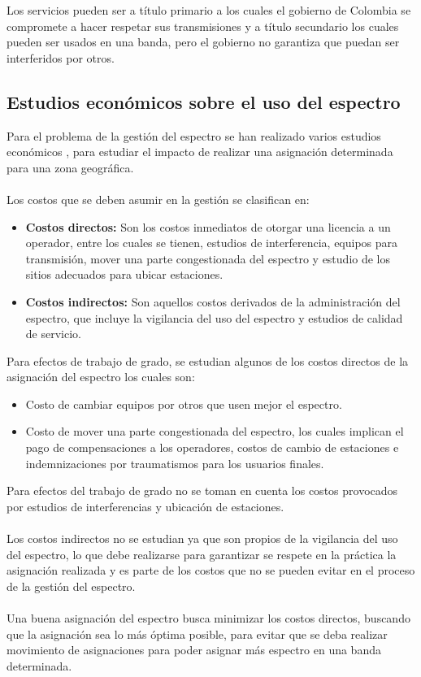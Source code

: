 Los servicios pueden ser a título primario a los cuales el gobierno de Colombia se compromete a hacer respetar sus transmisiones y a título secundario los cuales pueden ser usados en una banda, pero el gobierno no garantiza que puedan ser interferidos por otros.

\subsection{Estudios económicos sobre el uso del espectro}

Para el problema de la gestión del espectro se han realizado varios estudios económicos \cite{SpectrumITU}, para estudiar el impacto de realizar una asignación determinada para una zona geográfica.
\\\\
Los costos que se deben asumir en la gestión se clasifican en:
\begin{itemize}
	\item \textbf{Costos directos:} Son los costos inmediatos de otorgar una licencia a un operador, entre los cuales se tienen, estudios de interferencia, equipos para transmisión, mover una parte congestionada del espectro y estudio de los sitios adecuados para ubicar estaciones.
	\item \textbf{Costos indirectos:} Son aquellos costos derivados de la administración del espectro, que incluye la vigilancia del uso del espectro y estudios de calidad de servicio.
\end{itemize}

Para efectos de trabajo de grado, se estudian algunos de los costos directos de la asignación del espectro los cuales son:
\begin{itemize}
	\item Costo de cambiar equipos por otros que usen mejor el espectro.
	\item Costo de mover una parte congestionada del espectro, los cuales implican el pago de compensaciones a los operadores, costos de cambio de estaciones e indemnizaciones por traumatismos para los usuarios finales.
\end{itemize}
Para efectos del trabajo de grado no se toman en cuenta los costos provocados por estudios de interferencias y ubicación de estaciones.
\\\\
Los costos indirectos no se estudian ya que son propios de la vigilancia del uso del espectro, lo que debe realizarse para garantizar se respete en la práctica la asignación realizada y es parte de los costos que no se pueden evitar en el proceso de la gestión del espectro.
\\\\
Una buena asignación del espectro busca minimizar los costos directos, buscando que la asignación sea lo más óptima posible, para evitar que se deba realizar movimiento de asignaciones para poder asignar más espectro en una banda determinada.

